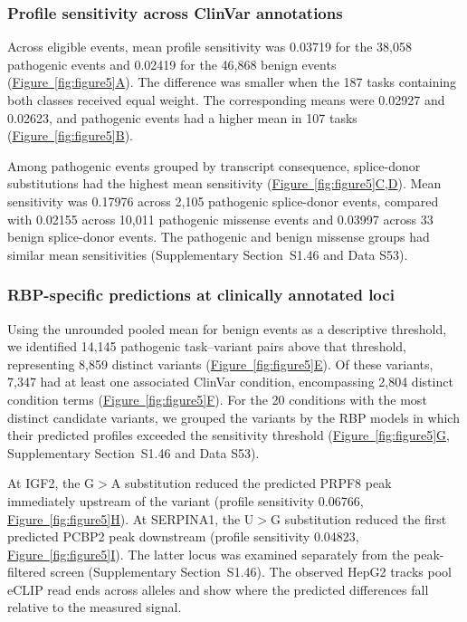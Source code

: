 \documentclass[webpdf,contemporary,large]{current_assets/oup-authoring-template}
\newcommand{\figpanelref}[2]{\hyperref[#1]{Figure~\ref*{#1}#2}}
\newcommand{\supsect}[1]{Supplementary Section~#1}
\begin{document}
\subsubsection{Profile sensitivity across ClinVar annotations}

Across eligible events, mean profile sensitivity was 0.03719 for the 38,058 pathogenic events and 0.02419 for the 46,868 benign events (\figpanelref{fig:figure5}{A}). The difference was smaller when the 187 tasks containing both classes received equal weight. The corresponding means were 0.02927 and 0.02623, and pathogenic events had a higher mean in 107 tasks (\figpanelref{fig:figure5}{B}).

Among pathogenic events grouped by transcript consequence, splice-donor substitutions had the highest mean sensitivity (\figpanelref{fig:figure5}{C,D}). Mean sensitivity was 0.17976 across 2,105 pathogenic splice-donor events, compared with 0.02155 across 10,011 pathogenic missense events and 0.03997 across 33 benign splice-donor events. The pathogenic and benign missense groups had similar mean sensitivities (\supsect{S1.46} and Data S53).

\subsubsection{RBP-specific predictions at clinically annotated loci}

Using the unrounded pooled mean for benign events as a descriptive threshold, we identified 14,145 pathogenic task--variant pairs above that threshold, representing 8,859 distinct variants (\figpanelref{fig:figure5}{E}). Of these variants, 7,347 had at least one associated ClinVar condition, encompassing 2,804 distinct condition terms (\figpanelref{fig:figure5}{F}). For the 20 conditions with the most distinct candidate variants, we grouped the variants by the RBP models in which their predicted profiles exceeded the sensitivity threshold (\figpanelref{fig:figure5}{G}, \supsect{S1.46} and Data S53).

At IGF2, the G$>$A substitution reduced the predicted PRPF8 peak immediately upstream of the variant (profile sensitivity 0.06766, \figpanelref{fig:figure5}{H}). At SERPINA1, the U$>$G substitution reduced the first predicted PCBP2 peak downstream (profile sensitivity 0.04823, \figpanelref{fig:figure5}{I}). The latter locus was examined separately from the peak-filtered screen (\supsect{S1.46}). The observed HepG2 tracks pool eCLIP read ends across alleles and show where the predicted differences fall relative to the measured signal.
\end{document}
